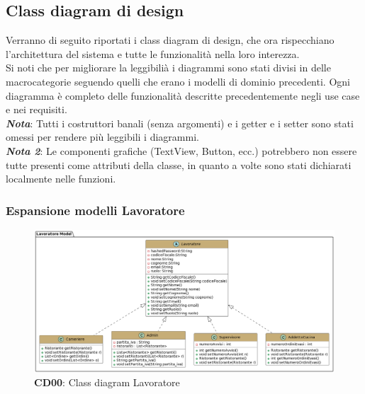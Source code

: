 \subsection{Class diagram di design}
    \begin{flushleft}
        Verranno di seguito riportati i class diagram di design, che ora rispecchiano l'architettura del sistema e tutte le funzionalità nella loro
        interezza. \\
        Si noti che per migliorare la leggibilià i diagrammi sono stati divisi in delle macrocategorie seguendo quelli che erano i modelli di dominio precedenti.
        Ogni diagramma è completo delle funzionalità descritte precedentemente negli use case e nei requisiti.\\
        \emph{\textbf{Nota}}: Tutti i costruttori banali (senza argomenti) e i getter e i setter sono stati omessi per rendere più leggibili i diagrammi.\\
        \emph{\textbf{Nota 2}}: Le componenti grafiche (TextView, Button, ecc.) potrebbero non essere tutte presenti come attributi della classe, in quanto a volte sono stati dichiarati localmente nelle funzioni.
        
    \end{flushleft}

    \subsubsection{Espansione modelli Lavoratore}
        \begin{figure}[H]
            \centering
            \includegraphics[scale=0.35]{assets/diagrammi/Class diagram di design/vista lavoratore.png}
            \caption*{\textbf{CD00}: Class diagram Lavoratore}\label{fig:ClassDiagram_Worker}
        \end{figure}

